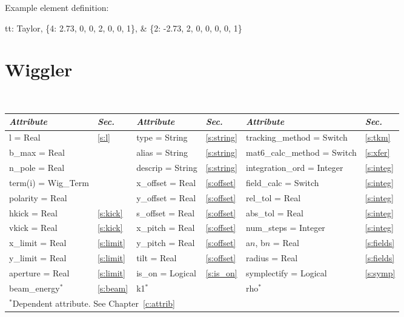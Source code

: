 {{Example  element definition:
\begin{example}
  tt: Taylor, \{4:  2.73, 0, 0, 2, 0, 0, 1\}, &
              \{2: -2.73, 2, 0, 0, 0, 0, 1\}
\end{example}

\section{Wiggler} 
\label{s:wig}

\begin{center}
\tt
\begin{tabular}{|l|l||l|l||l|l|} \hline
  {\sl Attribute} & {\sl Sec.}  & {\sl Attribute} & {\sl Sec.} & {\sl Attribute} & {\sl Sec.} \\ \hline
  l        = Real       & \ref{s:l}      & type = String      & \ref{s:string} & tracking\_method = Switch   & \ref{s:tkm}   \\ \hline
  b\_max   = Real       &                & alias = String     & \ref{s:string} & mat6\_calc\_method = Switch & \ref{s:xfer}  \\ \hline
  n\_pole  = Real       &                & descrip = String   & \ref{s:string} & integration\_ord = Integer  & \ref{s:integ} \\ \hline
  term(i) = Wig\_Term   &                & x\_offset  = Real  & \ref{s:offset} & field\_calc = Switch        & \ref{s:integ} \\ \hline
  polarity = Real       &                & y\_offset  = Real  & \ref{s:offset} & rel\_tol = Real             & \ref{s:integ} \\ \hline
  hkick    = Real       & \ref{s:kick}   & s\_offset  = Real  & \ref{s:offset} & abs\_tol = Real             & \ref{s:integ} \\ \hline
  vkick    = Real       & \ref{s:kick}   & x\_pitch = Real    & \ref{s:offset} & num\_steps = Integer        & \ref{s:integ} \\ \hline
  x\_limit = Real       & \ref{s:limit}  & y\_pitch = Real    & \ref{s:offset} & a$n$, b$n$ = Real           & \ref{s:fields}\\ \hline
  y\_limit = Real       & \ref{s:limit}  & tilt     = Real    & \ref{s:offset} & radius  = Real              & \ref{s:fields}\\ \hline
  aperture = Real       & \ref{s:limit}  & is\_on = Logical   & \ref{s:is_on}  & symplectify = Logical       & \ref{s:symp}  \\ \hline
  beam\_energy$^*$      & \ref{s:beam}   & k1$^*$             &                & rho$^*$                     &               \\ \hline
  \multicolumn{6}{l}{\small $^*$Dependent attribute. See Chapter~\ref{c:attrib}} \\
\end{tabular}
\end{center}
\toffset

}}
